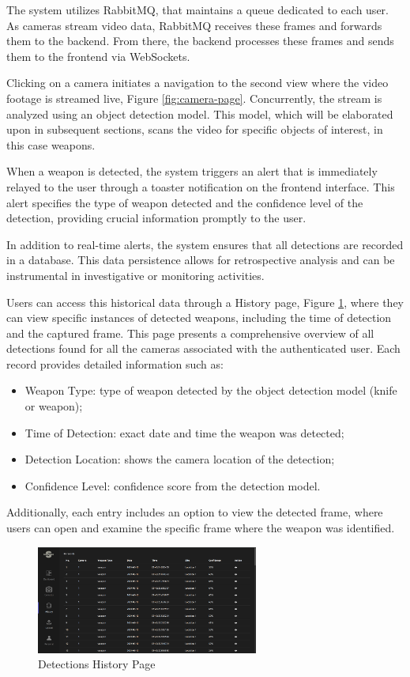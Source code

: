 The system utilizes RabbitMQ, that maintains a queue dedicated to each user. As cameras stream video data, 
RabbitMQ receives these frames and forwards them to the backend. From there, the backend processes these 
frames and sends them to the frontend via WebSockets.

Clicking on a camera initiates a navigation to the second view where the video footage is streamed live, Figure 
\ref{fig:camera-page}. 
Concurrently, the stream is analyzed using an object detection model. This model, which will be 
elaborated upon in subsequent sections, scans the video for specific objects of interest, in this case weapons.

When a weapon is detected, the system triggers an alert that is immediately relayed to the user through a toaster 
notification on the frontend interface. This alert specifies the type of weapon detected and the confidence level 
of the detection, providing crucial information promptly to the user. 

In addition to real-time alerts, the system ensures that all detections are recorded in a database. 
This data persistence allows for retrospective analysis and can be instrumental in investigative or 
monitoring activities.

Users can access this historical data through a History page, Figure \ref{fig:detections-history}, where they can 
view specific instances of detected weapons, including the time of detection and the captured frame. This page presents 
a comprehensive overview of all detections found for all the cameras associated with the authenticated user. Each 
record provides detailed information such as:
\begin{itemize}
    \item Weapon Type: type of weapon detected by the object detection model (knife or weapon);
    \item Time of Detection: exact date and time the weapon was detected;
    \item Detection Location: shows the camera location of the detection;
    \item Confidence Level: confidence score from the detection model.
\end{itemize}

Additionally, each entry includes an option to view the detected frame, where users can open and examine 
the specific frame where the weapon was identified. 
\begin{figure}[h]
    \centering 
    \includegraphics[width=0.65\textwidth]{figs/history-page.png} 
    \caption{Detections History Page}
    \label{fig:detections-history}
\end{figure}

